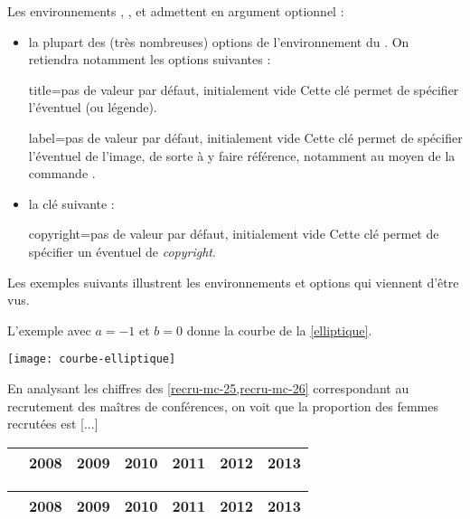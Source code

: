 Les environnements , ,  et
 admettent en argument optionnel :
\begin{itemize}
\item la plupart des (très nombreuses) options de l'environnement
   du . On retiendra notamment
  les options suivantes :
\begin{docKey}{title}{=}{pas de valeur par défaut,
    initialement vide}
  Cette clé permet de spécifier l'éventuel  (ou légende).
\end{docKey}
\begin{docKey}{label}{=}{pas de valeur par défaut, initialement
    vide}
  Cette clé permet de spécifier l'éventuel  de l'image, de sorte
  à y faire référence, notamment au moyen de la commande .
\end{docKey}
\item la clé  suivante :\begin{docKey}{copyright}{=}{pas de valeur par défaut, initialement
    vide}
  Cette clé permet de spécifier un éventuel  de
  \emph{copyright}.
\end{docKey}
\end{itemize}

Les exemples suivants illustrent les environnements et options qui viennent
d'être vus.
\begin{bodycode}[listing options={deletekeywords={[1]{exemple,title,label}},morekeywords={[2]{title,label}}}]
L'exemple avec $a=-1$ et $b=0$ donne la courbe de la \vref{elliptique}.
%
\begin{gztfigure}[title=Courbe elliptique correspondant à l'équation
  $y^2=x^3-x$,label=elliptique]
  \texttt{[image: courbe-elliptique]}
\end{gztfigure}
\end{bodycode}

\begin{bodycode}[listing options={morekeywords={[2]title,label},deletekeywords={[3]section}}]
En analysant les chiffres des \vref{recru-mc-25,recru-mc-26} correspondant au
recrutement des maîtres de conférences, on voit que la proportion des femmes
recrutées est [...]
%
\begin{gzttable*}[label=recru-mc-25,title=Recrutement des maîtres de
  conférences section 25]
  \begin{tabular}{|l|cccccc|}
    \hline
    & 2008 & 2009 & 2010 & 2011 & 2012 & 2013 \\ \hline
    [...]
  \end{tabular}
\end{gzttable*}
%
\begin{gzttable*}[label=recru-mc-26,title=Recrutement des maîtres de
  conférences section 26]
  \begin{tabular}{|l|cccccc|}
    \hline
    & 2008 & 2009 & 2010 & 2011 & 2012 & 2013 \\ \hline
    [...]
  \end{tabular}
\end{gzttable*}
\end{bodycode}

